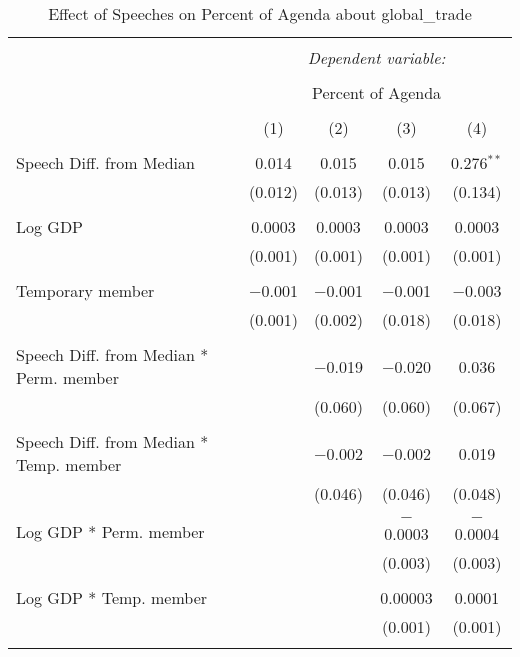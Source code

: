 
\begin{table}[!htbp] \centering 
  \caption{Effect of Speeches on Percent of Agenda about  global_trade} 
  \label{} 
\begin{tabular}{@{\extracolsep{5pt}}lcccc} 
\\[-1.8ex]\hline 
\hline \\[-1.8ex] 
 & \multicolumn{4}{c}{\textit{Dependent variable:}} \\ 
\cline{2-5} 
\\[-1.8ex] & \multicolumn{4}{c}{Percent of Agenda} \\ 
\\[-1.8ex] & (1) & (2) & (3) & (4)\\ 
\hline \\[-1.8ex] 
 Speech Diff. from Median & 0.014 & 0.015 & 0.015 & 0.276$^{**}$ \\ 
  & (0.012) & (0.013) & (0.013) & (0.134) \\ 
  & & & & \\ 
 Log GDP & 0.0003 & 0.0003 & 0.0003 & 0.0003 \\ 
  & (0.001) & (0.001) & (0.001) & (0.001) \\ 
  & & & & \\ 
 Temporary member & $-$0.001 & $-$0.001 & $-$0.001 & $-$0.003 \\ 
  & (0.001) & (0.002) & (0.018) & (0.018) \\ 
  & & & & \\ 
 Speech Diff. from Median * Perm. member &  & $-$0.019 & $-$0.020 & 0.036 \\ 
  &  & (0.060) & (0.060) & (0.067) \\ 
  & & & & \\ 
 Speech Diff. from Median * Temp. member &  & $-$0.002 & $-$0.002 & 0.019 \\ 
  &  & (0.046) & (0.046) & (0.048) \\ 
  & & & & \\ 
 Log GDP * Perm. member &  &  & $-$0.0003 & $-$0.0004 \\ 
  &  &  & (0.003) & (0.003) \\ 
  & & & & \\ 
 Log GDP * Temp. member &  &  & 0.00003 & 0.0001 \\ 
  &  &  & (0.001) & (0.001) \\ 
  & & & & \\ 

\end{tabular}
\end{table}
